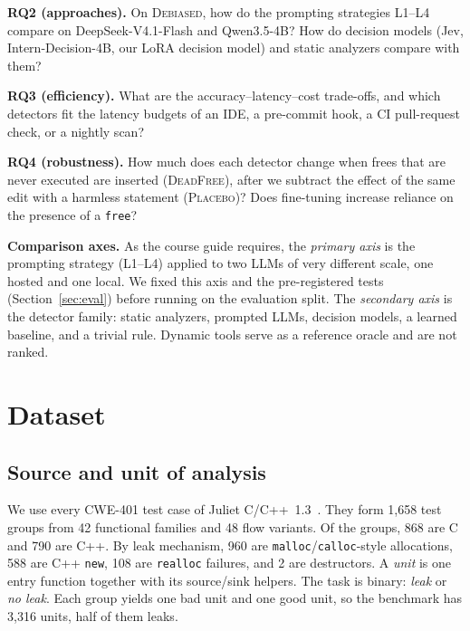 \documentclass[conference]{IEEEtran}
\newcommand{\Deb}{\textsc{Debiased}}
\newcommand{\Dead}{\textsc{DeadFree}}
\newcommand{\Plac}{\textsc{Placebo}}
\newcommand{\code}[1]{\texttt{#1}}
\newcommand{\cwe}{CWE-401}
\begin{document}
\noindent\textbf{RQ2 (approaches).} On \Deb{}, how do the prompting strategies L1--L4 compare on DeepSeek-V4.1-Flash and Qwen3.5-4B? How do decision models (Jev, Intern-Decision-4B, our LoRA decision model) and static analyzers compare with them?

\noindent\textbf{RQ3 (efficiency).} What are the accuracy--latency--cost trade-offs, and which detectors fit the latency budgets of an IDE, a pre-commit hook, a CI pull-request check, or a nightly scan?

\noindent\textbf{RQ4 (robustness).} How much does each detector change when frees that are never executed are inserted (\Dead{}), after we subtract the effect of the same edit with a harmless statement (\Plac{})? Does fine-tuning increase reliance on the presence of a \code{free}?

\textbf{Comparison axes.}
As the course guide requires, the \emph{primary axis} is the prompting strategy (L1--L4) applied to two LLMs of very different scale, one hosted and one local.
We fixed this axis and the pre-registered tests (Section~\ref{sec:eval}) before running on the evaluation split.
The \emph{secondary axis} is the detector family: static analyzers, prompted LLMs, decision models, a learned baseline, and a trivial rule.
Dynamic tools serve as a reference oracle and are not ranked.

\section{Dataset}
\label{sec:data}
\subsection{Source and unit of analysis}
We use every \cwe{} test case of Juliet C/C++~1.3~\cite{sardjuliet13,black2018juliet13}.
They form 1,658 test groups from 42 functional families and 48 flow variants. %
Of the groups, 868 are C and 790 are C++. %
By leak mechanism, 960 are \code{malloc}/\code{calloc}-style allocations, 588 are C++ \code{new}, 108 are \code{realloc} failures, and 2 are destructors. %
A \emph{unit} is one entry function together with its source/sink helpers.
The task is binary: \emph{leak} or \emph{no leak}.
Each group yields one bad unit and one good unit, so the benchmark has 3,316 units, half of them leaks. %
\end{document}
